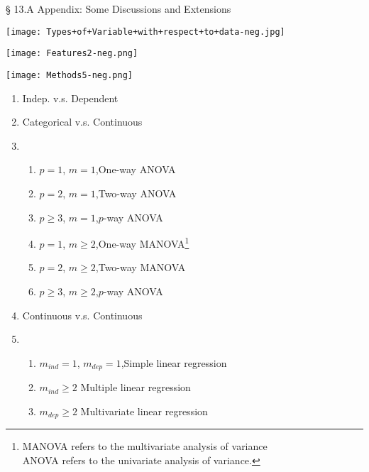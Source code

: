 \begin{frame}{\S\: 13.A Appendix: Some Discussions and Extensions }

\centering
\texttt{[image: Types+of+Variable+with+respect+to+data-neg.jpg]}
\end{frame}
\begin{frame}[fragile]
\centering
\texttt{[image: Features2-neg.png]}
\end{frame}
\begin{frame}[fragile]
\centering
\texttt{[image: Methods5-neg.png]}
\end{frame}
\begin{frame}[fragile]

\begin{enumerate}
\item[] Indep. \quad v.s. \quad Dependent
\item Categorical v.s. Continuous
\item[]
\begin{minipage}{0.7\textwidth}
\begin{enumerate}
\item $p=1$, $m=1$,\hfill One-way ANOVA
\item $p=2$, $m=1$,\hfill Two-way ANOVA
\item $p\ge 3$, $m=1$,\hfill $p$-way ANOVA
\\[2em]
\item $p=1$, $m\ge 2$,\hfill One-way MANOVA\footnote{MANOVA refers to the multivariate analysis of variance\\
\hspace{2em} ANOVA refers to the univariate analysis of variance.}
\item $p=2$, $m\ge 2$,\hfill Two-way MANOVA
\item $p\ge 3$, $m\ge 2$,\hfill $p$-way ANOVA
\end{enumerate}
\end{minipage}
\vfill
\item Continuous v.s. Continuous
\item[]
\begin{minipage}{0.7\textwidth}
\begin{enumerate}
\item $m_{ind}=1$, $m_{dep}=1$,\hfill Simple linear regression
\item $m_{ind}\ge 2$ \hfill Multiple linear regression
\item $m_{dep}\ge 2$ \hfill Multivariate linear regression
\end{enumerate}
\end{minipage}
\end{enumerate}
\end{frame}
